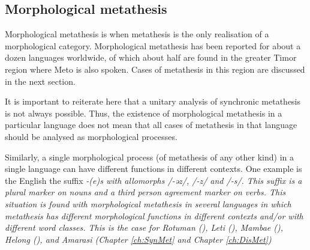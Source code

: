 \subsection{Morphological metathesis}\label{sec:MorMet}
Morphological metathesis is when metathesis is the
only realisation of a morphological category.
Morphological metathesis has been reported
for about a dozen languages worldwide, of which about half
are found in the greater Timor region where Meto is also spoken.
Cases of metathesis in this region are discussed in the next section.

It is important to reiterate here that a unitary analysis of synchronic
metathesis is not always possible.
Thus, the existence of morphological metathesis in a particular
language does not mean that all cases of metathesis in that
language should be analysed as morphological processes.

Similarly, a single morphological process (of metathesis of any other kind)
in a single language can have different functions in different contexts.
One example is the English the suffix \it{-(e)s} with allomorphs /-əz/, /-z/ and /-s/.
This suffix is a plural marker on nouns and a third person agreement marker on verbs.
This situation is found with morphological metathesis in several languages
in which metathesis has different morphological functions in different contexts
and/or with different word classes.
This is the case for Rotuman (), Leti (),
Mambae (), Helong (), and Amarasi
(Chapter \ref{ch:SynMet} and Chapter \ref{ch:DisMet})